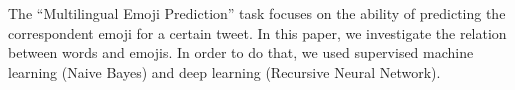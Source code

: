 The ``Multilingual Emoji Prediction'' task focuses on the ability of predicting the correspondent emoji for a certain tweet. In this paper, we investigate the relation between words and emojis. In order to do that, we used supervised machine learning (Naive Bayes) and deep learning (Recursive Neural Network).
